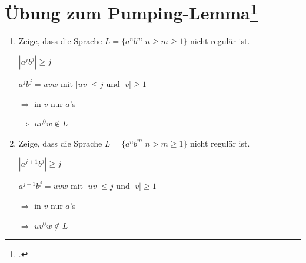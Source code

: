 \documentclass{lehramt-informatik-aufgabe}
\begin{document}
\section{Übung zum Pumping-Lemma\footcite[Seite 65]{theo:fs:1}
}

\begin{enumerate}

%

\item Zeige, dass die Sprache $L = \{ a^n b^m | n \geq m \geq 1 \}$ nicht
regulär ist.

\begin{liAntwort}
$|a^j b^j| \geq j$

$a^j b^j = uvw$
mit $|uv| \leq j$
und $|v| \geq 1$

$\Rightarrow$ in $v$ nur $a$’s

$\Rightarrow$ $uv^0w \notin L$
\end{liAntwort}

%

\item Zeige, dass die Sprache $L = \{ a^n b^m | n > m \geq 1 \}$ nicht
regulär ist.

\begin{liAntwort}
$|a^{j+1} b^j| \geq j $

$a^{j+1} b^j = uvw$
mit $|uv| \leq j$
und $|v| \geq 1$

$\Rightarrow$ in $v$ nur $a$’s

$\Rightarrow$ $uv^0w \notin L$
\end{liAntwort}
\end{enumerate}
\end{document}
